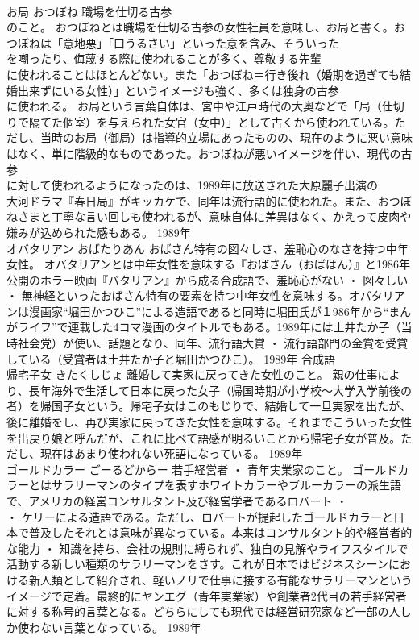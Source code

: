 \documentclass[8pt]{extreport}
\begin{document}
\begin{CJK}{UTF8}{min}
\\	お局	おつぼね	職場を仕切る古参
\\	のこと。	おつぼねとは職場を仕切る古参の女性社員を意味し、お局と書く。おつぼねは「意地悪」「口うるさい」といった意を含み、そういった
\\	を嘲ったり、侮蔑する際に使われることが多く、尊敬する先輩
\\	に使われることはほとんどない。また「おつぼね＝行き後れ（婚期を過ぎても結婚出来ずにいる女性）」というイメージも強く、多くは独身の古参
\\	に使われる。 お局という言葉自体は、宮中や江戸時代の大奥などで「局（仕切りで隔てた個室）を与えられた女官（女中）」として古くから使われている。ただし、当時のお局（御局）は指導的立場にあったものの、現在のように悪い意味はなく、単に階級的なものであった。おつぼねが悪いイメージを伴い、現代の古参
\\	に対して使われるようになったのは、1989年に放送された大原麗子出演の
\\	大河ドラマ『春日局』がキッカケで、同年は流行語的に使われた。また、おつぼねさまと丁寧な言い回しも使われるが、意味自体に差異はなく、かえって皮肉や嫌みが込められた感もある。	1989年	
\\	オバタリアン	おばたりあん	おばさん特有の図々しさ、羞恥心のなさを持つ中年女性。	オバタリアンとは中年女性を意味する『おばさん（おばはん）』と1986年公開のホラー映画『バタリアン』から成る合成語で、羞恥心がない ・ 図々しい ・ 無神経といったおばさん特有の要素を持つ中年女性を意味する。オバタリアンは漫画家“堀田かつひこ”による造語であると同時に堀田氏が１986年から“まんがライフ”で連載した4コマ漫画のタイトルでもある。1989年には土井たか子（当時社会党）が使い、話題となり、同年、流行語大賞 ・ 流行語部門の金賞を受賞している（受賞者は土井たか子と堀田かつひこ）。	1989年	合成語	
\\	帰宅子女	きたくしじょ	離婚して実家に戻ってきた女性のこと。	親の仕事により、長年海外で生活して日本に戻った女子（帰国時期が小学校～大学入学前後の者）を帰国子女という。帰宅子女はこのもじりで、結婚して一旦実家を出たが、後に離婚をし、再び実家に戻ってきた女性を意味する。それまでこういった女性を出戻り娘と呼んだが、これに比べて語感が明るいことから帰宅子女が普及。ただし、現在はあまり使われない死語になっている。	1989年	
\\	ゴールドカラー	ごーるどからー	若手経営者 ・ 青年実業家のこと。	ゴールドカラーとはサラリーマンのタイプを表すホワイトカラーやブルーカラーの派生語で、アメリカの経営コンサルタント及び経営学者であるロバート ・ 
\\	・ ケリーによる造語である。ただし、ロバートが提起したゴールドカラーと日本で普及したそれとは意味が異なっている。本来はコンサルタント的や経営者的な能力 ・ 知識を持ち、会社の規則に縛られず、独自の見解やライフスタイルで活動する新しい種類のサラリーマンをさす。これが日本ではビジネスシーンにおける新人類として紹介され、軽いノリで仕事に接する有能なサラリーマンというイメージで定着。最終的にヤンエグ（青年実業家）や創業者2代目の若手経営者に対する称号的言葉となる。どちらにしても現代では経営研究家など一部の人しか使わない言葉となっている。	1989年	

\end{CJK}
\end{document}
